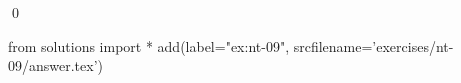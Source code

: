
\begin{ex} 
  \label{ex:nt-09}
  
  \qed
\end{ex} 
\begin{python0}
from solutions import *
add(label="ex:nt-09",
    srcfilename='exercises/nt-09/answer.tex') 
\end{python0}
